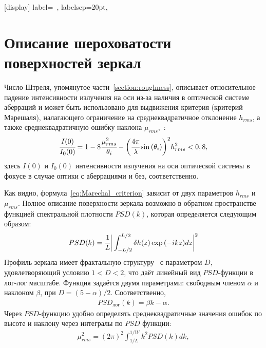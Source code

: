 \appendix
\sectionformat{\chapter}[display]{%
    label=\chaptertitlename\ \thechapter,%
    labelsep=20pt,
}
\renewcommand\thechapter{\Asbuk{chapter}} %
\chapter{Описание шероховатости поверхностей зеркал} \label{AppendixB}
Число Штреля, упомянутое части~\ref{section:roughness}, описывает относительное падение интенсивности излучения на оси из-за наличия в оптической системе аберраций и может быть использовано для выдвижения критерия (критерий Марешаля), налагающего ограничение на среднеквадратичное отклонение $h_{rms}$, а также среднеквадратичную ошибку наклона $\mu_{rms}$,~\cite{church_specification_1993}:
\begin{align}
	\cfrac{I(0)}{I_0(0)} = 1 - 8\cfrac{\mu^2_{rms}}{\theta_i} - \bigg(\cfrac{4 \pi}{\lambda} \sin{(\theta_i)} \bigg)^2 h^2_{rms} < 0,8,
	\label{eq:Marechal_criterion}
\end{align}
здесь $I(0)$ и $I_0(0)$ интенсивности излучения на оси оптической системы в фокусе в случае оптики с аберрациями и без, соответственно. 

Как видно, формула~\ref{eq:Marechal_criterion} зависит от двух параметров $h_{rms}$ и $\mu_{rms}$. Полное описание поверхности зеркала возможно в обратном пространстве функцией спектральной плотности $PSD(k)$, которая определяется следующим образом: 
\begin{align}
	PSD(k) =  \cfrac{1}{L} \bigg| \int_{-L/2}^{L/2} \delta h(z) \exp{(-ikz)dz}  \bigg|^2
	\label{eq:PSD_def}
\end{align}
Профиль зеркала имеет фрактальную структуру~\cite{angeisky_fractal_nodate} с параметром $D$, удовлетворяющий условию $1 < D < 2$, что даёт линейный вид $PSD$-функции в лог-лог масштабе. Функция задаётся двумя параметрами: свободным членом $\alpha$ и наклоном $\beta$, при $D = (5 - \alpha)/2$. Соответственно, 
\begin{align}
	PSD_{лог}(k) =  \beta k - \alpha.
\end{align}
Через $PSD$-функцию удобно определять среднеквадратичные значения ошибок по высоте и наклону через интегралы по $PSD$ функции:
\begin{align}
	\mu^2_{rms} =  (2 \pi)^2 \int^{1/W}_{1/L} k^2 PSD(k) dk,
\end{align}

